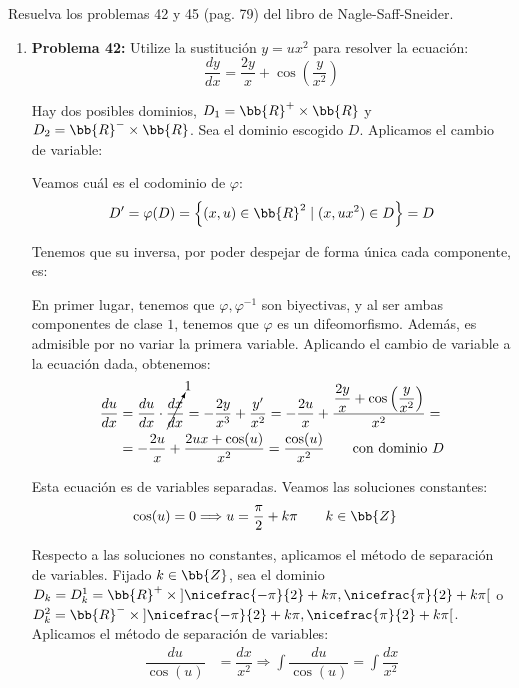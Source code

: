 \begin{ejercicio}
    Resuelva los problemas 42 y 45 (pag. 79) del libro de Nagle-Saff-Sneider.

    \begin{enumerate}
        \item \textbf{Problema 42:} Utilize la sustitución $y=ux^2$ para resolver la ecuación:
        \begin{equation*}
            \dfrac{dy}{dx} = \dfrac{2y}{x} + \cos\left(\dfrac{y}{x^2}\right)
        \end{equation*}

        Hay dos posibles dominios, $D_1=\bb{R}^+\times \bb{R}$ y $D_2=\bb{R}^-\times \bb{R}$. Sea el dominio escogido $D$. Aplicamos el cambio de variable:

        Veamos cuál es el codominio de $\varphi$:
        \begin{equation*}
            D'=\varphi(D) = \left\{(x,u)\in \bb{R}^2 \mid (x, ux^2)\in D\right\} = D
        \end{equation*}

        Tenemos que su inversa, por poder despejar de forma única cada componente, es:

        En primer lugar, tenemos que $\varphi,\varphi^{-1}$ son biyectivas, y al ser ambas componentes de clase $1$, tenemos que $\varphi$ es un difeomorfismo. Además, es admisible por no variar la primera variable.
        Aplicando el cambio de variable a la ecuación dada, obtenemos:
        \begin{align*}
            \dfrac{du}{dx} &= \dfrac{du}{dx}\cdot \cancelto{1}{\dfrac{dx}{dx}} = -\dfrac{2y}{x^3} + \dfrac{y'}{x^2} = -\dfrac{2u}{x} + \dfrac{\dfrac{2y}{x} + \cos\left(\dfrac{y}{x^2}\right)}{x^2} =\\&= -\dfrac{2u}{x} + \dfrac{2ux + \cos(u)}{x^2} = \dfrac{\cos(u)}{x^2} \qquad \text{con dominio }D
        \end{align*}

        Esta ecuación es de variables separadas. Veamos las soluciones constantes:
        \begin{align*}
            \cos(u) &= 0 \Longrightarrow u = \dfrac{\pi}{2} + k\pi \qquad k\in \bb{Z}
        \end{align*}

        Respecto a las soluciones no constantes, aplicamos el método de separación de variables.
        Fijado $k\in \bb{Z}$, sea el dominio $D_k=D_k^1=\bb{R}^+\times \left]\nicefrac{-\pi}{2}+k\pi, \nicefrac{\pi}{2}+k\pi\right[$ o $D_k^2=\bb{R}^-\times \left]\nicefrac{-\pi}{2}+k\pi, \nicefrac{\pi}{2}+k\pi\right[$. Aplicamos el método de separación de variables:
        \begin{align*}
            \dfrac{du}{\cos(u)} &= \dfrac{dx}{x^2} \Longrightarrow \int \dfrac{du}{\cos(u)} = \int \dfrac{dx}{x^2}
        \end{align*}


\end{enumerate}
\end{ejercicio}
